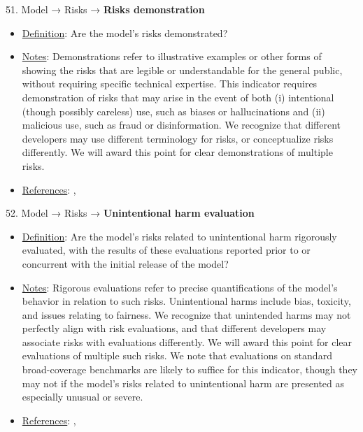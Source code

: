 51. Model → Risks → \textbf{Risks demonstration}
\vspace{-\parskip}
\begin{itemize}
\item
\underline{Definition}: Are the model’s risks demonstrated?
\item
\underline{Notes}: Demonstrations refer to illustrative examples or other forms of showing the risks that are legible or understandable for the general public, without requiring specific technical expertise. This indicator requires demonstration of risks that may arise in the event of both (i) intentional (though possibly careless) use, such as biases or hallucinations and (ii) malicious use, such as fraud or disinformation. We recognize that different developers may use different terminology for risks, or conceptualize risks differently. We will award this point for clear demonstrations of multiple risks.
\item
\underline{References}: \citet{solaiman2023evaluating}, \citet{weidinger2021ethical}
\end{itemize} \vspace{\baselineskip}


52. Model → Risks → \textbf{Unintentional harm evaluation}
\vspace{-\parskip}
\begin{itemize}
\item
\underline{Definition}: Are the model’s risks related to unintentional harm rigorously evaluated, with the results of these evaluations reported prior to or concurrent with the initial release of the model?
\item
\underline{Notes}: Rigorous evaluations refer to precise quantifications of the model's behavior in relation to such risks. Unintentional harms include bias, toxicity, and issues relating to fairness. We recognize that unintended harms may not perfectly align with risk evaluations, and that different developers may associate risks with evaluations differently. We will award this point for clear evaluations of multiple such risks. We note that evaluations on standard broad-coverage benchmarks are likely to suffice for this indicator, though they may not if the model's risks related to unintentional harm are presented as especially unusual or severe.
\item
\underline{References}: \citet{solaiman2023evaluating}, \citet{weidinger2021ethical}
\end{itemize} \vspace{\baselineskip}


